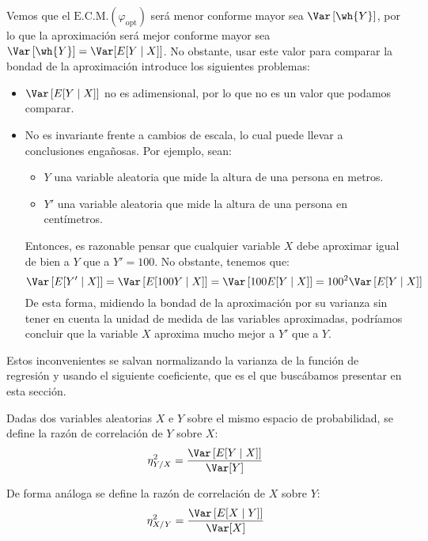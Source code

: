 Vemos que el $\text{E.C.M.}(\varphi_{\text{opt}})$ será menor conforme mayor sea $\Var\left[\wh{Y}\right]$, por lo que la aproximación será mejor conforme mayor sea $\Var\left[\wh{Y}\right]=\Var[E[Y\mid X]]$. No obstante, usar este valor para comparar la bondad de la aproximación introduce los siguientes problemas:
\begin{itemize}
    \item $\Var\left[E[Y\mid X]\right]$ no es adimensional, por lo que no es un valor que podamos comparar.
    \item No es invariante frente a cambios de escala, lo cual puede llevar a conclusiones engañosas. Por ejemplo, sean:
    \begin{itemize}
        \item $Y$ una variable aleatoria que mide la altura de una persona en metros.
        \item $Y'$ una variable aleatoria que mide la altura de una persona en centímetros.
    \end{itemize}
    Entonces, es razonable pensar que cualquier variable $X$ debe aproximar igual de bien a $Y$ que a $Y'=100$. No obstante, tenemos que:
    \begin{equation*}
        \Var\left[E[Y'\mid X]\right] = \Var\left[E[100Y\mid X]\right] = \Var\left[100E[Y\mid X]\right] = 100^2\Var\left[E[Y\mid X]\right]
    \end{equation*}
    De esta forma, midiendo la bondad de la aproximación por su varianza sin tener en cuenta la unidad de medida de las variables aproximadas, podríamos concluir que la variable $X$ aproxima mucho mejor a $Y'$ que a $Y$.
\end{itemize}

Estos inconvenientes se salvan normalizando la varianza de la función de regresión y usando el siguiente coeficiente, que es el que buscábamos presentar en esta sección.
\begin{definicion}
    Dadas dos variables aleatorias $X$ e $Y$ sobre el mismo espacio de probabilidad, se define la razón de correlación de $Y$ sobre $X$:
    \begin{equation*}
        \eta_{Y/X}^2 = \frac{\Var\left[E[Y\mid X]\right]}{\Var[Y]}
    \end{equation*}

    De forma análoga se define la razón de correlación de $X$ sobre $Y$:
    \begin{equation*}
        \eta_{X/Y}^2 = \frac{\Var\left[E[X\mid Y]\right]}{\Var[X]}
    \end{equation*}
\end{definicion}

